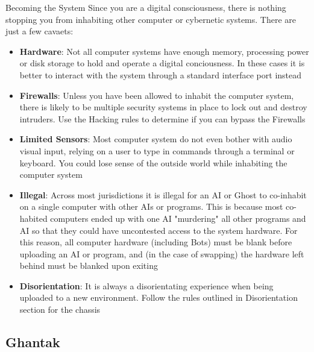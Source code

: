 \documentclass[10pt,twoside]{article}
\begin{document}
\begin{multicols}{2}
  \begin{commentbox}{Becoming the System} 
  Since you are a digital consciousness, there is nothing stopping you from inhabiting other computer or cybernetic systems. There are just a few cavaets:
    \begin{itemize}
      \item \textbf{Hardware}: Not all computer systems have enough memory, processing power or disk storage to hold and operate a digital conciousness. In these cases it is better to interact with the system through a standard interface port instead\\
      \item \textbf{Firewalls}: Unless you have been allowed to inhabit the computer system, there is likely to be multiple security systems in place to lock out and destroy intruders. Use the Hacking rules to determine if you can bypass the Firewalls\\
      \item \textbf{Limited Sensors}: Most computer system do not even bother with audio visual input, relying on a user to type in commands through a terminal or keyboard. You could lose sense of the outside world while inhabiting the computer system\\
      \item \textbf{Illegal}: Across most jurisdictions it is illegal for an AI or Ghost to co-inhabit on a single computer with other AIs or programs. This is because most co-habited computers ended up with one AI "murdering" all other programs and AI so that they could have uncontested access to the system hardware. For this reason, all computer hardware (including Bots) must be blank before uploading an AI or program, and (in the case of swapping) the hardware left behind must be blanked upon exiting\\
      \item \textbf{Disorientation}: It is always a disorientating experience when being uploaded to a new environment. Follow the rules outlined in Disorientation section for the chassis
    \end{itemize}
  \end{commentbox}

  \columnbreak

  \subsection{Ghantak}


\end{multicols}
\end{document}
